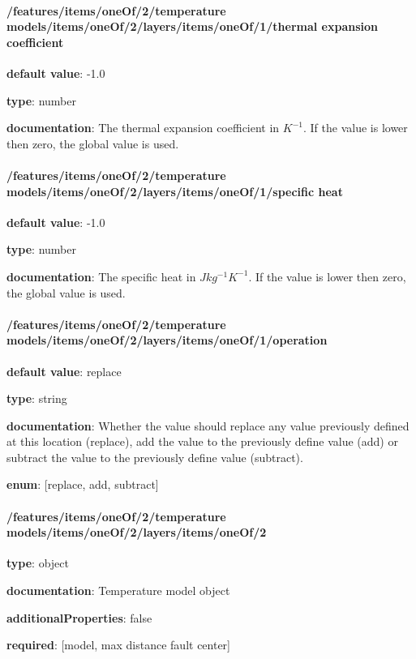 \begin{itemized}
\end{itemized}\paragraph{/features/items/oneOf/2/temperature models/items/oneOf/2/layers/items/oneOf/1/thermal expansion coefficient} \begin{itemized}
\item {\bf default value}: -1.0
\item {\bf type}: number
\item {\bf documentation}: The thermal expansion coefficient in $K^{-1}$. If the value is lower then zero, the global value is used.
\end{itemized}\paragraph{/features/items/oneOf/2/temperature models/items/oneOf/2/layers/items/oneOf/1/specific heat} \begin{itemized}
\item {\bf default value}: -1.0
\item {\bf type}: number
\item {\bf documentation}: The specific heat in $J kg^{-1} K^{-1}$. If the value is lower then zero, the global value is used.
\end{itemized}\paragraph{/features/items/oneOf/2/temperature models/items/oneOf/2/layers/items/oneOf/1/operation} \begin{itemized}
\item {\bf default value}: replace
\item {\bf type}: string
\item {\bf documentation}: Whether the value should replace any value previously defined at this location (replace), add the value to the previously define value (add) or subtract the value to the previously define value (subtract).
\item {\bf enum}: [replace, add, subtract]\end{itemized}\paragraph{/features/items/oneOf/2/temperature models/items/oneOf/2/layers/items/oneOf/2} \begin{itemized}
\item {\bf type}: object
\item {\bf documentation}: Temperature model object
\item {\bf additionalProperties}: false
\item {\bf required}: [model, max distance fault center]\end{itemized}
